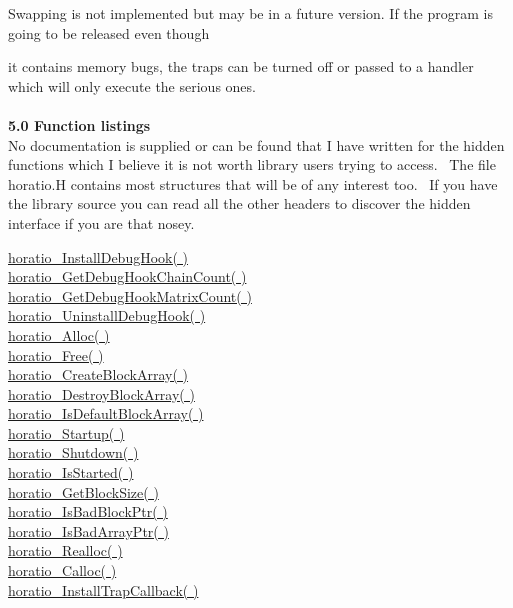 \documentclass{article}
\begin{document}
\par Swapping is not implemented but may be in a future version.
If the program is going to be released even though
\\

\par it contains memory bugs, the traps can be turned off or passed to
a handler which will only execute the serious ones.
\\
\\
\textbf{5.0 Function listings}
\\
No documentation is supplied or can be found that I have written for
the hidden functions which I believe it is not worth library users
trying
to access.~ The file horatio.H contains most structures that will
be of any interest too.~ If you have the library source you can
read
all the other headers to discover the hidden interface if you are that
nosey.
\par \href{#InstallDebugHook}{horatio\_InstallDebugHook( )}
\\
\href{#GetDebugHookChainCount}{horatio\_GetDebugHookChainCount(
)}
\\
\href{#GetDebugHookMatrixCount}{horatio\_GetDebugHookMatrixCount(
)}
\\
\href{#UninstallDebugHook}{horatio\_UninstallDebugHook( )}
\\
\href{#Alloc}{horatio\_Alloc( )}
\\
\href{#Free}{horatio\_Free( )}
\\
\href{#CreateBlockArray}{horatio\_CreateBlockArray( )}
\\
\href{#DestroyBlockArray}{horatio\_DestroyBlockArray( )}
\\
\href{#IsDefaultBlockArray}{horatio\_IsDefaultBlockArray( )}
\\
\href{#Startup}{horatio\_Startup( )}
\\
\href{#Shutdown}{horatio\_Shutdown( )}
\\
\href{#IsStarted}{horatio\_IsStarted( )}
\\
\href{#GetBlockSize}{horatio\_GetBlockSize( )}
\\
\href{#IsBasBlockPtr}{horatio\_IsBadBlockPtr( )}
\\
\href{#IsBadArrayPtr}{horatio\_IsBadArrayPtr( )}
\\
\href{#Realloc}{horatio\_Realloc( )}
\\
\href{#Calloc}{horatio\_Calloc( )}
\\
\href{#InstallTrapCallback}{horatio\_InstallTrapCallback( )}
\\
\end{document}
